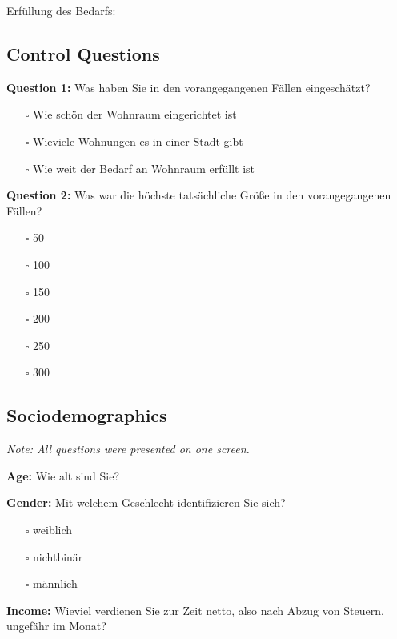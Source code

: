 \documentclass[egregdoesnotlikesansseriftitles]{scrartcl}
\begin{document}
\vspace{1em}
Erfüllung des Bedarfs:


\subsection*{Control Questions}
\noindent\textbf{Question 1:} Was haben Sie in den vorangegangenen Fällen eingeschätzt?
\begin{itemize}
   \item[$\square$] Wie schön der Wohnraum eingerichtet ist
   \item[$\square$] Wieviele Wohnungen es in einer Stadt gibt
   \item[$\square$] Wie weit der Bedarf an Wohnraum erfüllt ist
\end{itemize}

\vspace{1em}
\noindent\textbf{Question 2:} Was war die höchste tatsächliche Größe in den vorangegangenen Fällen?
\begin{itemize}
   \item[$\square$] 50
   \item[$\square$] 100
   \item[$\square$] 150
   \item[$\square$] 200
   \item[$\square$] 250
   \item[$\square$] 300
\end{itemize}


\subsection*{Sociodemographics}
\textit{Note: All questions were presented on one screen.}

\vspace{1em}
\noindent\textbf{Age:} Wie alt sind Sie?

\vspace{1em}
\noindent\textbf{Gender:} Mit welchem Geschlecht identifizieren Sie sich?
\begin{itemize}
   \item[$\square$] weiblich
   \item[$\square$] nichtbinär
   \item[$\square$] männlich
\end{itemize}

\vspace{1em}
\noindent\textbf{Income:} Wieviel verdienen Sie zur Zeit netto, also nach Abzug von Steuern, ungefähr im Monat?
\end{document}
